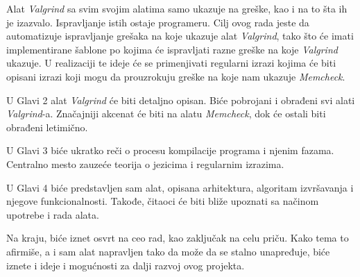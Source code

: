 \documentclass[12pt,oneside]{memoir}
\theoremstyle{plain}
\theoremstyle{definition}
\begin{document}
Alat \textit{Valgrind} sa svim svojim alatima samo ukazuje na greške, kao i na to šta ih je izazvalo. Ispravljanje istih ostaje programeru. Cilj ovog rada jeste da automatizuje ispravljanje grešaka na koje ukazuje alat \textit{Valgrind}, tako što će imati implementirane šablone po kojima će ispravljati razne greške na koje \textit{Valgrind} ukazuje. U realizaciji te ideje će se primenjivati regularni izrazi kojima će biti opisani izrazi koji mogu da prouzrokuju greške na koje nam ukazuje \textit{Memcheck}.

U Glavi 2 alat \textit{Valgrind} će biti detaljno opisan. Biće pobrojani i obrađeni svi alati \textit{Valgrind}-a.  Značajniji akcenat će biti na alatu \textit{Memcheck}, dok će ostali biti obrađeni letimično. 

U Glavi 3 biće ukratko reči o procesu kompilacije programa i njenim fazama. Centralno mesto zauzeće teorija o jezicima i regularnim izrazima. 

U Glavi 4 biće predstavljen sam alat, opisana arhitektura, algoritam izvršavanja i njegove funkcionalnosti. Takođe, čitaoci će biti bliže upoznati sa načinom upotrebe i rada alata. 

Na kraju, biće iznet osvrt na ceo rad, kao zaključak na celu priču. Kako tema to afirmiše, a i sam alat napravljen tako da može da se stalno unapređuje, biće iznete i ideje i mogućnosti za dalji razvoj ovog projekta.
\end{document}
